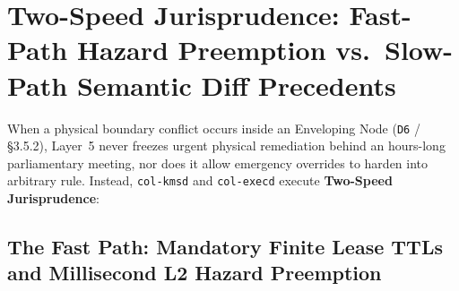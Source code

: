 \section{Two-Speed Jurisprudence: Fast-Path Hazard Preemption vs.\ Slow-Path Semantic Diff Precedents}
\label{sec:ch7-two-speed-jurisprudence}

When a physical boundary conflict occurs inside an Enveloping Node (\texttt{D6} / \S3.5.2),
Layer~5 never freezes urgent physical remediation behind an hours-long parliamentary meeting, nor
does it allow emergency overrides to harden into arbitrary rule. Instead, \texttt{col-kmsd} and
\texttt{col-execd} execute \textbf{Two-Speed Jurisprudence}:

\subsection{The Fast Path: Mandatory Finite Lease TTLs and Millisecond L2 Hazard Preemption}

